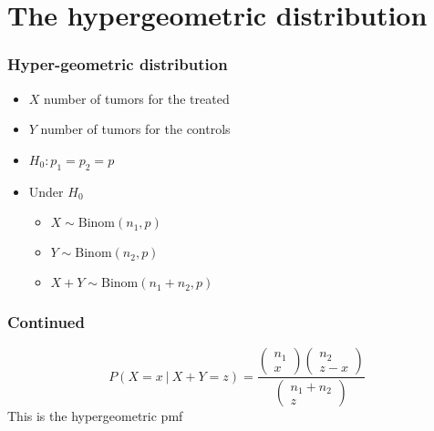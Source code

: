 \documentclass[aspectratio=169]{beamer}
\begin{document}
\section{The hypergeometric distribution}
\begin{frame}\frametitle{Hyper-geometric distribution}
  \begin{itemize}
  \item $X$ number of tumors for the treated
  \item $Y$ number of tumors for the controls
  \item $H_0: p_1 = p_2 = p$
  \item Under $H_0$
    \begin{itemize}
    \item  $X \sim \mbox{Binom}(n_1, p)$
    \item  $Y \sim \mbox{Binom}(n_2, p)$
    \item  $X + Y \sim \mbox{Binom}(n_1 + n_2, p)$
    \end{itemize}
\end{itemize}
\end{frame}

\begin{frame}\frametitle{Continued}
$$P(X = x ~|~ X + Y = z) = 
\frac{
\left(
\begin{array}{c}
n_1 \\ x
\end{array}
\right)
\left(
\begin{array}{c}
n_2 \\ z - x
\end{array}
\right)
}
{
\left(
\begin{array}{c}
n_1 + n_2 \\ z
\end{array}
\right)
}
$$
This is the hypergeometric pmf
\end{frame}
\end{document}
